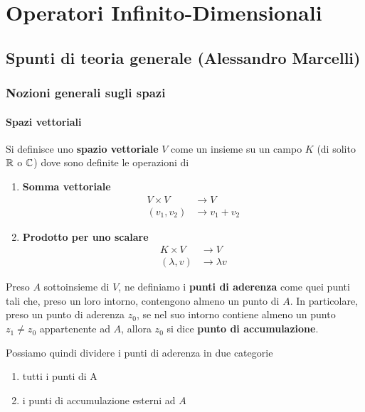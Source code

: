 \chapter{Operatori Infinito-Dimensionali}

\section{Spunti di teoria generale (Alessandro Marcelli)}

\subsection{Nozioni generali sugli spazi}

\subsubsection{Spazi vettoriali}

Si definisce uno \textbf{spazio vettoriale} $V$ come un insieme su un campo $K$ (di solito $\mathbb{R}$ o $\mathbb{C}$) dove sono definite le operazioni di
\begin{enumerate}
	\item \textbf{Somma vettoriale}
	\begin{align}
		V \times V &\rightarrow V\\
		(v_1,v_2)&\rightarrow v_1 + v_2
	\end{align}
	\item \textbf{Prodotto per uno scalare}
	\begin{align}
	K \times V &\rightarrow V\\
	(\lambda,v)&\rightarrow \lambda v
\end{align}
\end{enumerate}

Preso $A$ sottoinsieme di $V$, ne definiamo i \textbf{punti di aderenza} come quei punti tali che, preso un loro intorno, contengono almeno un punto di $A$. \newline
In particolare, preso un punto di aderenza $z_0$, se nel suo intorno contiene almeno un punto $z_1 \neq z_0$ appartenente ad $A$, allora $z_0$ si dice \textbf{punto di accumulazione}.

Possiamo quindi dividere i punti di aderenza in due categorie
\begin{enumerate}
	\item tutti i punti di A
	\item  i punti di accumulazione esterni ad $A$
\end{enumerate}

